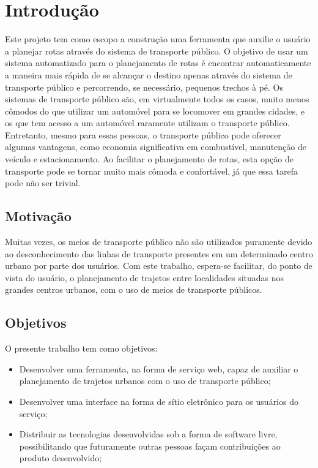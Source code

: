 \chapter{Introdução}

Este projeto tem como escopo a construção uma ferramenta que auxilie o usuário a planejar rotas através do sistema de transporte público. O objetivo de usar um sistema automatizado para o planejamento de rotas é encontrar automaticamente a maneira mais rápida de se alcançar o destino apenas através do sistema de transporte público e percorrendo, se necessário, pequenos trechos à pé. Os sistemas de transporte público são, em virtualmente todos os casos, muito menos cômodos do que utilizar um automóvel para se locomover em grandes cidades, e os que tem acesso a um automóvel raramente utilizam o transporte público. Entretanto, mesmo para essas pessoas, o transporte público pode oferecer algumas vantagens, como economia significativa em combustível, manutenção de veículo e estacionamento. Ao facilitar o planejamento de rotas, esta opção de transporte pode se tornar muito mais cômoda e confortável, já que essa tarefa pode não ser trivial.

\section{Motivação}

Muitas vezes, os meios de transporte público não são utilizados puramente devido ao desconhecimento das linhas de transporte presentes em um determinado centro urbano por parte dos usuários. Com este trabalho, espera-se facilitar, do ponto de vista do usuário, o planejamento de trajetos entre localidades situadas nos grandes centros urbanos, com o uso de meios de transporte públicos.

\section{Objetivos}

O presente trabalho tem como objetivos:

\begin{itemize}
	\item Desenvolver uma ferramenta, na forma de serviço web, capaz de auxiliar o planejamento de trajetos urbanos com o uso de transporte público;
	\item Desenvolver uma interface na forma de sítio eletrônico para os usuários do serviço;
	\item Distribuir as tecnologias desenvolvidas sob a forma de software livre, possibilitando que futuramente outras pessoas façam contribuições ao produto desenvolvido;
\end{itemize}

